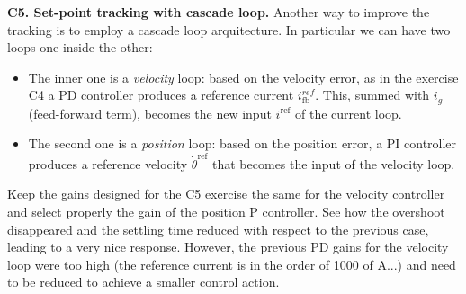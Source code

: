 \documentclass[11pt]{article}
\begin{document}
\textbf{C5. Set-point tracking with cascade loop. }
Another way to improve the tracking is to employ a cascade loop arquitecture. 
In particular we can have two loops one inside the other: 

\begin{itemize}
    \item The inner one is a \textit{velocity} loop: based on the velocity error, as in the exercise C4  
    a PD controller produces a reference current $i^{ref}_{\mathrm{fb}}$. This, summed with $i_g$ (feed-forward term), becomes the new input $i^\mathrm{ref}$ of the current loop. 
    \item The second one is a \textit{position} loop: based on the position error, a PI controller produces a reference velocity $\dot{\theta}^\mathrm{ref}$ that becomes the input of the velocity loop.
\end{itemize}
%
Keep the gains designed for the C5 exercise the same for the velocity controller and 
select properly the gain of the position P controller. 
See how the overshoot disappeared and the settling time reduced 
with respect to the previous case, leading to a very nice response. 
However, the previous PD gains for the velocity loop were too high (the reference current is in the order of 1000 of A...)
and need to be reduced to achieve a smaller control action. 
\end{document}
